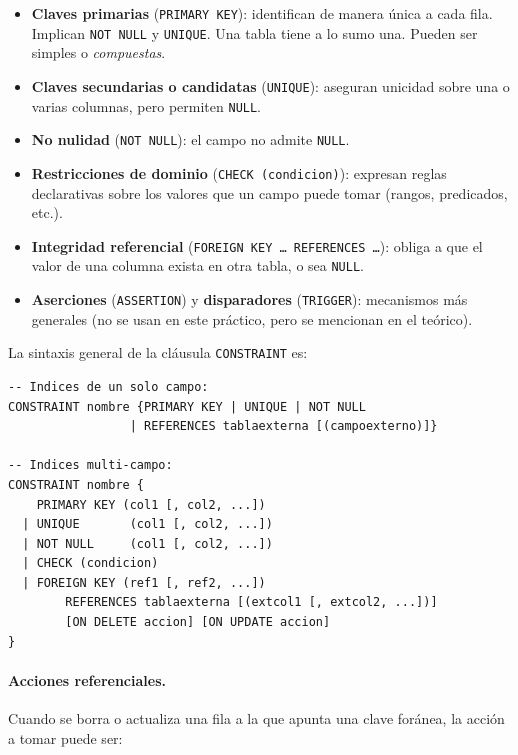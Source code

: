 \documentclass[11pt,a4paper]{article}
\begin{document}
\begin{itemize}
    \item \textbf{Claves primarias} (\texttt{PRIMARY KEY}): identifican de
    manera única a cada fila. Implican \texttt{NOT NULL} y \texttt{UNIQUE}.
    Una tabla tiene a lo sumo una. Pueden ser simples o \emph{compuestas}.
    \item \textbf{Claves secundarias o candidatas} (\texttt{UNIQUE}):
    aseguran unicidad sobre una o varias columnas, pero permiten
    \texttt{NULL}.
    \item \textbf{No nulidad} (\texttt{NOT NULL}): el campo no admite
    \texttt{NULL}.
    \item \textbf{Restricciones de dominio} (\texttt{CHECK (condicion)}):
    expresan reglas declarativas sobre los valores que un campo puede tomar
    (rangos, predicados, etc.).
    \item \textbf{Integridad referencial} (\texttt{FOREIGN KEY \dots\
    REFERENCES \dots}): obliga a que el valor de una columna exista en otra
    tabla, o sea \texttt{NULL}.
    \item \textbf{Aserciones} (\texttt{ASSERTION}) y \textbf{disparadores}
    (\texttt{TRIGGER}): mecanismos más generales (no se usan en este
    práctico, pero se mencionan en el teórico).
\end{itemize}

La sintaxis general de la cláusula \texttt{CONSTRAINT} es:

\begin{lstlisting}
-- Indices de un solo campo:
CONSTRAINT nombre {PRIMARY KEY | UNIQUE | NOT NULL
                 | REFERENCES tablaexterna [(campoexterno)]}

-- Indices multi-campo:
CONSTRAINT nombre {
    PRIMARY KEY (col1 [, col2, ...])
  | UNIQUE       (col1 [, col2, ...])
  | NOT NULL     (col1 [, col2, ...])
  | CHECK (condicion)
  | FOREIGN KEY (ref1 [, ref2, ...])
        REFERENCES tablaexterna [(extcol1 [, extcol2, ...])]
        [ON DELETE accion] [ON UPDATE accion]
}
\end{lstlisting}

\paragraph{Acciones referenciales.}
Cuando se borra o actualiza una fila a la que apunta una clave foránea, la
acción a tomar puede ser:
\end{document}
